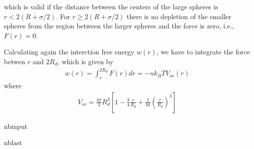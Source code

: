\documentclass[letterpaper,10pt,english]{sphinxmanual}
\begin{document}
\sphinxAtStartPar
which is valid if the distance between the centers of the large spheres is \(r<2(R+σ/2)\). For \(r≥2(R+σ/2)\) there is no depletion of the smaller spheres from the region between the larger spheres and the force is zero, i.e., \(F(r)=0\).

\sphinxAtStartPar
Calculating again the interction free energy \(w(r)\), we have to integrate the force betwen \(r\) and \(2R_{d}\), which is given by
\begin{equation*}
\begin{split}w(r)=\int_r^{2R_d}F(r)dr=-nk_B T V_{ov}(r)\end{split}
\end{equation*}
\sphinxAtStartPar
where
\begin{equation*}
\begin{split}V_{ov}=\frac{4\pi}{3}R_{d}^3\left [ 1-\frac{3}{4}\frac{r}{R_d}+\frac{1}{16}\left ( \frac{r}{R_d}\right )^3 \right ]\end{split}
\end{equation*}
\begin{sphinxuseclass}{nbinput}
\begin{sphinxuseclass}{nblast}
{
\begin{sphinxVerbatim}[commandchars=\\\{\}]
\llap{\color{nbsphinxin}[38]:\,\hspace{\fboxrule}\hspace{\fboxsep}} 
     
\end{sphinxVerbatim}
}

\end{sphinxuseclass}
\end{sphinxuseclass}
\end{document}

